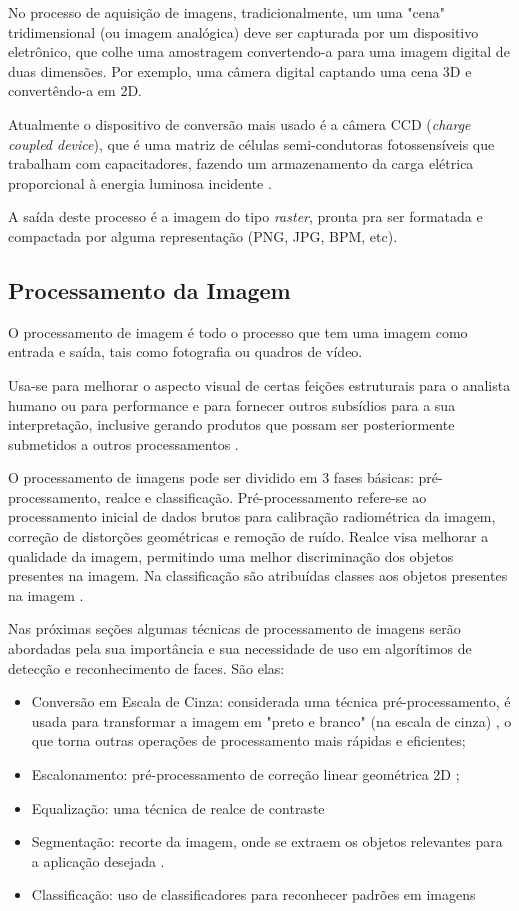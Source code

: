 No processo de aquisição de imagens, tradicionalmente, um uma "cena" tridimensional (ou imagem analógica) deve ser capturada por um dispositivo eletrônico, que colhe uma amostragem convertendo-a para uma imagem digital de duas dimensões. Por exemplo, uma câmera digital captando uma cena 3D e convertêndo-a em 2D.

Atualmente o dispositivo de conversão mais usado  é a câmera CCD (\textit{charge coupled device}), que é uma matriz de células semi-condutoras fotossensíveis que trabalham com capacitadores, fazendo um armazenamento da carga elétrica proporcional à energia luminosa incidente \cite{gonzalez_woods}.

A saída deste processo é a imagem do tipo \textit{raster}, pronta pra ser formatada e compactada por alguma representação (PNG, JPG, BPM, etc). 

\subsection{Processamento da Imagem}\label{subsec:processamento}

O processamento de imagem é todo o processo que tem uma imagem como entrada e saída, tais como fotografia ou quadros de vídeo. 

Usa-se para melhorar o aspecto visual de certas feições estruturais para o analista humano ou para performance e para fornecer outros subsídios para a sua interpretação, inclusive gerando produtos que possam ser posteriormente submetidos a outros processamentos \cite{inpe_proc_img}.

O processamento de imagens pode ser dividido em 3 fases básicas: pré-processamento, realce e classificação.
Pré-processamento refere-se ao processamento inicial de dados brutos para calibração radiométrica da imagem, correção de distorções geométricas e remoção de ruído.
Realce visa melhorar a qualidade da imagem, permitindo uma melhor discriminação dos objetos presentes na imagem.
Na classificação são atribuídas classes aos objetos presentes na imagem \cite{inpe_proc_img}.

Nas próximas seções algumas técnicas de processamento de imagens serão abordadas pela sua importância e sua necessidade de uso em algorítimos de detecção e reconhecimento de faces. São elas:

\begin{itemize}
	\item Conversão em Escala de Cinza: considerada uma técnica pré-processamento, é usada para transformar a imagem em "preto e branco" (na escala de cinza) , o que torna outras operações de processamento mais rápidas e eficientes;
	\item Escalonamento: pré-processamento de correção linear geométrica 2D \cite{lapix_escala};
	\item Equalização: uma técnica de realce de contraste \cite{gonzalez_woods}
	\item Segmentação: recorte da imagem, onde se extraem os objetos relevantes para a aplicação desejada \cite{inpe_proc_img}.
	\item Classificação: uso de classificadores para reconhecer padrões em imagens \cite{drmathew_java_programming}
\end{itemize}

